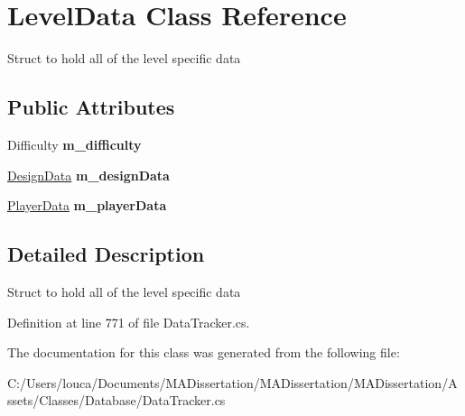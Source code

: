 \hypertarget{class_level_data}{}\section{Level\+Data Class Reference}
\label{class_level_data}


Struct to hold all of the level specific data  


\subsection*{Public Attributes}
\begin{DoxyCompactItemize}
\item 
\mbox{\label{class_level_data_ae71232991e512840a7bcee2da61623ed}} 
Difficulty {\bfseries m\+\_\+difficulty}
\item 
\mbox{\label{class_level_data_a2a26f9fdceb605e6cab2650767620f53}} 
\mbox{\hyperlink{class_design_data}{Design\+Data}} {\bfseries m\+\_\+design\+Data}
\item 
\mbox{\label{class_level_data_a4799c169b555d272151b150da57f6ec8}} 
\mbox{\hyperlink{struct_player_data}{Player\+Data}} {\bfseries m\+\_\+player\+Data}
\end{DoxyCompactItemize}


\subsection{Detailed Description}
Struct to hold all of the level specific data 



Definition at line 771 of file Data\+Tracker.\+cs.



The documentation for this class was generated from the following file\+:\begin{DoxyCompactItemize}
\item 
C\+:/\+Users/louca/\+Documents/\+M\+A\+Dissertation/\+M\+A\+Dissertation/\+M\+A\+Dissertation/\+Assets/\+Classes/\+Database/Data\+Tracker.\+cs\end{DoxyCompactItemize}
